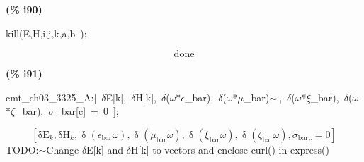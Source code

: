 \documentclass[fleqn]{article}
\begin{document}
\noindent
\begin{minipage}[t]{4.000000em}\color{red}\bfseries
(\% i90)	
\end{minipage}
\begin{minipage}[t]{\textwidth}\color{blue}
kill(E,H,i,j,k,a,b\ );
\end{minipage}
\[\displaystyle \tag{\% o90} 
\ensuremath{\mathrm{done}}\mbox{}
\]


\noindent
\begin{minipage}[t]{4.000000em}\color{red}\bfseries
(\% i91)	
\end{minipage}
\begin{minipage}[t]{\textwidth}\color{blue}
cmt\_ch03\_3325\_A:[\ \ensuremath{\delta}E[k],\ \ensuremath{\delta}H[k],\ \ensuremath{\delta}(\ensuremath{\omega}*\ensuremath{\epsilon}\_bar),\ \ensuremath{\delta}(\ensuremath{\omega}*\ensuremath{\mu}\_bar)\ensuremath{\sim\ },\ \ensuremath{\delta}(\ensuremath{\omega}*\ensuremath{\xi}\_bar),\ \ensuremath{\delta}(\ensuremath{\omega}*\ensuremath{\zeta}\_bar),\ \ensuremath{\sigma}\_bar[c]\ =\ 0\ ];
\end{minipage}
\[\displaystyle \tag{cmt\_ ch03\_ 3325\_ A} 
\left[ {{\ensuremath{\mathrm{\delta E}}}_k}\operatorname{,}{{\ensuremath{\mathrm{\delta H}}}_k}\operatorname{,}\operatorname{\delta }\left( {{\epsilon }_{\ensuremath{\mathrm{bar}}}} \omega \right) \operatorname{,}\operatorname{\delta }\left( {{\mu }_{\ensuremath{\mathrm{bar}}}} \omega \right) \operatorname{,}\operatorname{\delta }\left( {{\xi }_{\ensuremath{\mathrm{bar}}}} \omega \right) \operatorname{,}\operatorname{\delta }\left( {{\zeta }_{\ensuremath{\mathrm{bar}}}} \omega \right) \operatorname{,}{{{{\sigma }_{\ensuremath{\mathrm{bar}}}}}_c}=0\right] \mbox{}
\]
TODO:\ensuremath{\sim }Change \ensuremath{\delta}E[k] and \ensuremath{\delta}H[k] to vectors and enclose curl() in express()
\end{document}
